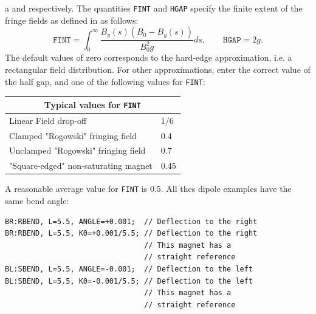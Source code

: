 a  and
 respectively.
The quantities \texttt{FINT} and \texttt{HGAP} specify
the finite extent of the fringe fields as defined in
as follows:
\[
\mathtt{FINT} = \int_0^\infty{\frac{B_y(s) (B_0 - B_y(s))}{B_0^2 g}}ds,\qquad
\mathtt{HGAP} = 2 g.
\]
The default values of zero corresponds to the hard-edge approximation,
i.e. a rectangular field distribution.
For other approximations, enter the correct value of the half gap,
and one of the following values for \texttt{FINT}:
\begin{center}
  \begin{tabular}{|l|l|}
    \hline
    \multicolumn{2}{|c|}{Typical values for \texttt{FINT}} \\
    \hline
    Linear Field drop-off                & 1/6  \\
    Clamped "Rogowski" fringing field    & 0.4  \\
    Unclamped "Rogowski" fringing field  & 0.7  \\
    "Square-edged" non-saturating magnet & 0.45 \\
    \hline
  \end{tabular}
\end{center}
A reasonable average value for \texttt{FINT} is 0.5.
All thes dipole examples have the same bend angle:
\begin{verbatim}
BR:RBEND, L=5.5, ANGLE=+0.001;  // Deflection to the right
BR:RBEND, L=5.5, K0=+0.001/5.5; // Deflection to the right
                                // This magnet has a 
                                // straight reference
BL:SBEND, L=5.5, ANGLE=-0.001;  // Deflection to the left
BL:SBEND, L=5.5, K0=-0.001/5.5; // Deflection to the left
                                // This magnet has a 
                                // straight reference
\end{verbatim}

